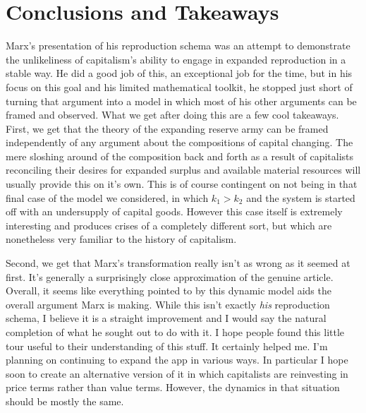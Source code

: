 \documentclass{article}
\theoremstyle{theorem}
\begin{document}
\section{Conclusions and Takeaways}
	Marx's presentation of his reproduction schema was an attempt to demonstrate the unlikeliness of capitalism's ability to engage in expanded reproduction in a stable way. He did a good job of this, an exceptional job for the time, but in his focus on this goal and his limited mathematical toolkit, he stopped just short of turning that argument into a model in which most of his other arguments can be framed and observed. What we get after doing this are a few cool takeaways. First, we get that the theory of the expanding reserve army can be framed independently of any argument about the compositions of capital changing. The mere sloshing around of the composition back and forth as a result of capitalists reconciling their desires for expanded surplus and available material resources will usually provide this on it's own. This is of course contingent on not being in that final case of the model we considered, in which $k_1 > k_2$ and the system is started off with an undersupply of capital goods. However this case itself is extremely interesting and produces crises of a completely different sort, but which are nonetheless very familiar to the history of capitalism. \par 
	Second, we get that Marx's transformation really isn't as wrong as it seemed at first. It's generally a surprisingly close approximation of the genuine article. Overall, it seems like everything pointed to by this dynamic model aids the overall argument Marx is making. While this isn't exactly \emph{his} reproduction schema, I believe it is a straight improvement and I would say the natural completion of what he sought out to do with it. I hope people found this little tour useful to their understanding of this stuff. It certainly helped me. I'm planning on continuing to expand the app in various ways. In particular I hope soon to create an alternative version of it in which capitalists are reinvesting in price terms rather than value terms. However, the dynamics in that situation should be mostly the same.
\end{document}
